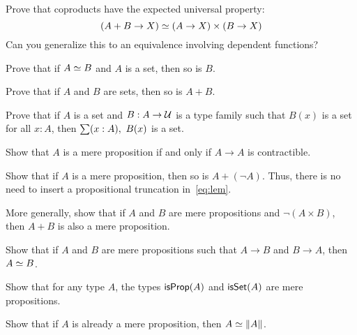 \begin{ex}
  Prove that coproducts have the expected universal property:
  \[ (A+B \to X) \simeq (A\to X)\times (B\to X) \]
  Can you generalize this to an equivalence involving dependent functions?
\end{ex}

\begin{ex}
  Prove that if $A \simeq B$ and $A$ is a set, then so is $B$.
\end{ex}

\begin{ex}\label{ex:isset-coprod}
  Prove that if $A$ and $B$ are sets, then so is $A+B$.
\end{ex}

\begin{ex}\label{ex:isset-sigma}
  Prove that if $A$ is a set and $B:A\to \mathcal{U}$ is a type family such that $B(x)$ is a set for all $x:A$, then $\sm{x:A} B(x)$ is a set.
\end{ex}

\begin{ex}\label{ex:prop-endocontr}
  Show that $A$ is a mere proposition if and only if $A\to A$ is contractible.
\end{ex}

\begin{ex}
  Show that if $A$ is a mere proposition, then so is $A+(\neg A)$.
  Thus, there is no need to insert a propositional truncation in~\eqref{eq:lem}.
\end{ex}

\begin{ex}\label{ex:disjoint-or}
  More generally, show that if $A$ and $B$ are mere propositions and $\neg(A\times B)$, then $A+B$ is also a mere proposition.
\end{ex}

\begin{ex}\label{ex:hprop-iff-equiv}
  Show that if $A$ and $B$ are mere propositions such that $A\to B$ and $B\to A$, then $A \simeq B$.
\end{ex}

\begin{ex}\label{ex:isprop-isprop}
  Show that for any type $A$, the types $\mathsf{isProp}(A)$ and $\mathsf{isSet}(A)$ are mere propositions.
\end{ex}

\begin{ex}\label{ex:prop-eqvtrunc}
  Show that if $A$ is already a mere proposition, then $A \simeq \Vert A\Vert_{}$.
\end{ex}

